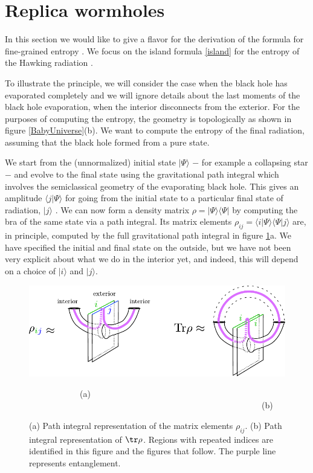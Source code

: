

\section{Replica wormholes}

In this section we would like to give a flavor for the derivation of the 
formula for fine-grained entropy \cite{Lewkowycz:2013nqa,Faulkner:2013ana,Dong:2016hjy,Dong:2017xht,Penington:2019kki,Almheiri:2019qdq}. We focus on the island formula \eqref{island} for the entropy of the Hawking radiation \cite{Penington:2019kki,Almheiri:2019qdq}.

To illustrate the principle, we will consider the case when the black hole has evaporated completely and we will ignore details about the last moments of the black hole evaporation, when the interior disconnects from the exterior. For the purposes of computing the entropy,  the geometry is topologically as shown in figure \ref{BabyUniverse}(b). We want to compute the entropy of the final radiation, assuming that the black hole formed from a pure state.


  We start from the (unnormalized) initial state $|\Psi\rangle$ $-$ for example a collapsing star $-$   and evolve to the final state using the gravitational path integral which involves the semiclassical geometry of the evaporating black hole. This gives an amplitude $\langle j | \Psi\rangle$ for going from the initial state to a particular final state of radiation, $|j\rangle $ . We can now form a density matrix $\rho = |\Psi\rangle\langle \Psi|$ by computing the bra of the same state via a path integral. Its matrix elements $\rho_{ij} = \langle i |\Psi\rangle\langle \Psi|j\rangle$ are, in principle,  computed by the full gravitational path integral in figure \ref{fig:rhoLorentzianA}a. We have specified the initial and final state on the outside, but we have not been very explicit about what we do in the interior yet, and indeed, this will depend on a choice of $|i\rangle $ and $|j\rangle$.
  

\begin{figure}
\begin{center}
\includegraphics[scale=1]{figures/rhoLorentzianA.pdf}

~~~~~~~~~~~~(a) ~~~~~~~~~~~~~~~~~~~~~~~~~~~~~~~~~~~~~~~~~~~~~~~~~~~~~~~(b)
\end{center}
\caption{\small (a) Path integral representation of the matrix elements $\rho_{ij}$. (b) Path integral representation of $\tr \rho$. Regions with repeated indices are identified in this figure and the figures that follow. The purple line represents entanglement. \label{fig:rhoLorentzianA}}
\end{figure}

